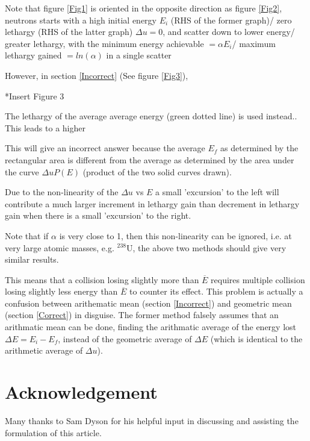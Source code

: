 \documentclass[a4paper, 12pt]{article}
\begin{document}
	Note that figure \ref{Fig1} is oriented in the opposite direction as figure \ref{Fig2}, neutrons starts with a high initial energy $E_i$ (RHS of the former graph)/ zero lethargy (RHS of the latter graph) $\Delta u=0$, and scatter down to lower energy/ greater lethargy, with the minimum energy achievable $= \alpha E_i$/ maximum lethargy gained $= ln(\alpha)$ in a single scatter

	
	However, in section \ref{Incorrect} (See figure \ref{Fig3}),
	
	*Insert Figure 3
	
	The lethargy of the average average energy (green dotted line) is used instead.. This leads to a higher

	This will give an incorrect answer because the average $E_f$ as determined by the rectangular area is different from the average as determined by the area under the curve $ \Delta u P(E)$ (product of the two solid curves drawn).

	Due to the non-linearity of the $\Delta u$ vs $E$ a small 'excursion' to the left will contribute a much larger increment in lethargy gain than decrement in lethargy gain when there is a small 'excursion' to the right.
	
	Note that if $\alpha$ is very close to 1, then this non-linearity can be ignored, i.e. at very large atomic masses, e.g. ${}^{238}$U, the above two methods should give very similar results.

	This means that a collision losing slightly more than $\overline{E}$ requires multiple collision losing slightly less energy than $\overline{E}$ to counter its effect.
	This problem is actually a confusion between arithematic mean (section \ref{Incorrect}) and geometric mean (section \ref{Correct}) in disguise. The former method falsely assumes that an arithmatic mean can be done, finding the arithmatic average of the energy lost $\Delta E = E_i-E_f$, instead of the geometric average of $\Delta E$ (which is identical to the arithmetic average of $\Delta u$).

\section{Acknowledgement}
	Many thanks to Sam Dyson for his helpful input in discussing and assisting the formulation of this article.
\end{document}
